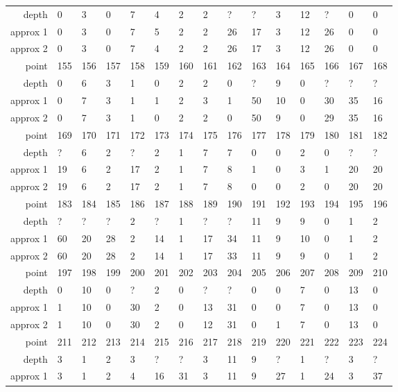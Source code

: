 \begin{center}
\begin{supertabular}{|r|l l l l l l l l l l l l l l|}
\hline
depth & 0 & 3 & 0 & 7 & 4 & 2 & 2 & ? & ? & 3 & 12 & ? & 0 & 0 \\
approx 1 & 0 & 3 & 0 & 7 & 5 & 2 & 2 & 26 & 17 & 3 & 12 & 26 & 0 & 0 \\
approx 2 & 0 & 3 & 0 & 7 & 4 & 2 & 2 & 26 & 17 & 3 & 12 & 26 & 0 & 0 \\
\hline
point & 155 & 156 & 157 & 158 & 159 & 160 & 161 & 162 & 163 & 164 & 165 & 166 & 167 & 168 \\
\hline
depth & 0 & 6 & 3 & 1 & 0 & 2 & 2 & 0 & ? & 9 & 0 & ? & ? & ? \\
approx 1 & 0 & 7 & 3 & 1 & 1 & 2 & 3 & 1 & 50 & 10 & 0 & 30 & 35 & 16 \\
approx 2 & 0 & 7 & 3 & 1 & 0 & 2 & 2 & 0 & 50 & 9 & 0 & 29 & 35 & 16 \\
\hline
point & 169 & 170 & 171 & 172 & 173 & 174 & 175 & 176 & 177 & 178 & 179 & 180 & 181 & 182 \\
\hline
depth & ? & 6 & 2 & ? & 2 & 1 & 7 & 7 & 0 & 0 & 2 & 0 & ? & ? \\
approx 1 & 19 & 6 & 2 & 17 & 2 & 1 & 7 & 8 & 1 & 0 & 3 & 1 & 20 & 20 \\
approx 2 & 19 & 6 & 2 & 17 & 2 & 1 & 7 & 8 & 0 & 0 & 2 & 0 & 20 & 20 \\
\hline
point & 183 & 184 & 185 & 186 & 187 & 188 & 189 & 190 & 191 & 192 & 193 & 194 & 195 & 196 \\
\hline
depth & ? & ? & ? & 2 & ? & 1 & ? & ? & 11 & 9 & 9 & 0 & 1 & 2 \\
approx 1 & 60 & 20 & 28 & 2 & 14 & 1 & 17 & 34 & 11 & 9 & 10 & 0 & 1 & 2 \\
approx 2 & 60 & 20 & 28 & 2 & 14 & 1 & 17 & 33 & 11 & 9 & 9 & 0 & 1 & 2 \\
\hline
point & 197 & 198 & 199 & 200 & 201 & 202 & 203 & 204 & 205 & 206 & 207 & 208 & 209 & 210 \\
\hline
depth & 0 & 10 & 0 & ? & 2 & 0 & ? & ? & 0 & 0 & 7 & 0 & 13 & 0 \\
approx 1 & 1 & 10 & 0 & 30 & 2 & 0 & 13 & 31 & 0 & 0 & 7 & 0 & 13 & 0 \\
approx 2 & 1 & 10 & 0 & 30 & 2 & 0 & 12 & 31 & 0 & 1 & 7 & 0 & 13 & 0 \\
\hline
point & 211 & 212 & 213 & 214 & 215 & 216 & 217 & 218 & 219 & 220 & 221 & 222 & 223 & 224 \\
\hline
depth & 3 & 1 & 2 & 3 & ? & ? & 3 & 11 & 9 & ? & 1 & ? & 3 & ? \\
approx 1 & 3 & 1 & 2 & 4 & 16 & 31 & 3 & 11 & 9 & 27 & 1 & 24 & 3 & 37 \\

\end{supertabular}
\end{center}

